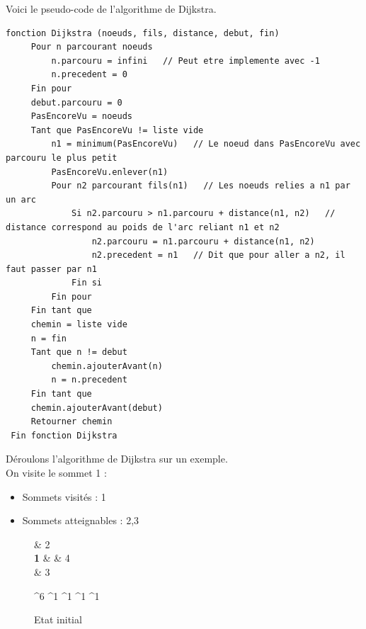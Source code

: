 \documentclass[a4paper,12pt,final] {article}
\begin{document}
Voici le pseudo-code de l'algorithme de Dijkstra.
\begin{lstlisting}
fonction Dijkstra (noeuds, fils, distance, debut, fin)
     Pour n parcourant noeuds
         n.parcouru = infini   // Peut etre implemente avec -1
         n.precedent = 0
     Fin pour
     debut.parcouru = 0
     PasEncoreVu = noeuds
     Tant que PasEncoreVu != liste vide
         n1 = minimum(PasEncoreVu)   // Le noeud dans PasEncoreVu avec parcouru le plus petit
         PasEncoreVu.enlever(n1)
         Pour n2 parcourant fils(n1)   // Les noeuds relies a n1 par un arc
             Si n2.parcouru > n1.parcouru + distance(n1, n2)   // distance correspond au poids de l'arc reliant n1 et n2
                 n2.parcouru = n1.parcouru + distance(n1, n2)
                 n2.precedent = n1   // Dit que pour aller a n2, il faut passer par n1
             Fin si
         Fin pour
     Fin tant que
     chemin = liste vide
     n = fin
     Tant que n != debut
         chemin.ajouterAvant(n)
         n = n.precedent
     Fin tant que
     chemin.ajouterAvant(debut)
     Retourner chemin
 Fin fonction Dijkstra
\end{lstlisting}

Déroulons l'algorithme de Dijkstra sur un exemple.\\
On visite le sommet 1 :
\begin{itemize}
\item Sommets visités : 1
\item Sommets atteignables : 2,3
\end{itemize}

\begin{figure}[H]
 \centering
 \begin{psmatrix}[mnode=circle]
	    & 2\\
	 {\color{red} \bf 1} &    & 4\\
	    & 3\\
\end{psmatrix}
	
	^{6}
	^{1}
	^{1}
	^{1}
	^{1}

  \caption{Etat initial}
\end{figure}
\end{document}
